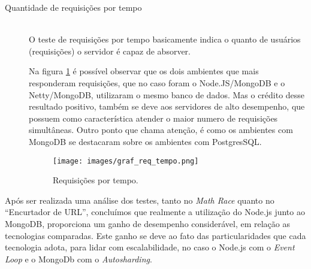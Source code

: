 \begin{description}
\clearpage
\item[Quantidade de requisições por tempo] \hfill \\
O teste de requisições por tempo basicamente indica o quanto de usuários (requisições) o servidor é capaz de absorver.\cite{NodejsEMongodb}

Na figura \ref{fig:graf_tempo} é possível observar que os dois ambientes que mais responderam requisições, que no caso foram o Node.JS/MongoDB e o Netty/MongoDB, utilizaram o mesmo banco de dados. Mas o crédito desse resultado positivo, também se deve aos servidores de alto desempenho, que possuem como característica atender o maior numero de requisições simultâneas. Outro ponto que chama atenção, é como os ambientes com MongoDB se destacaram sobre os ambientes com PostgresSQL.

\begin{figure}[htb]
\texttt{[image: images/graf\_req\_tempo.png]}
\caption{Requisições por tempo. \cite{NodejsEMongodb}}
\label{fig:graf_tempo}
\end{figure}

\end{description}


Após ser realizada uma análise dos testes, tanto no \textit{Math Race} quanto no ``Encurtador de URL'', concluímos que realmente a utilização do Node.js junto ao MongoDB, proporciona um ganho de desempenho considerável, em relação as tecnologias comparadas. Este ganho se deve ao fato das particularidades que cada tecnologia adota, para lidar com escalabilidade, no caso o Node.js com o \textit{Event Loop} e o MongoDb com o \textit{Autosharding}.










